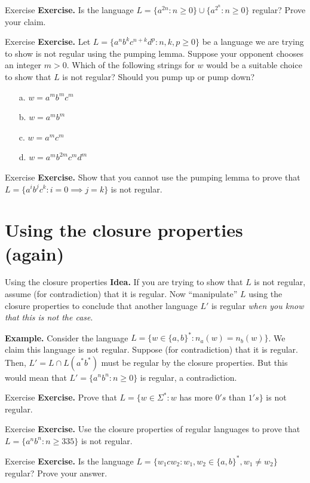 \documentclass[10pt]{beamer}
\begin{document}
\begin{frame}[t]{Exercise}
    \textbf{Exercise.} Is the language $L = \{a^{2n} : n \geq 0\} \cup \{a^{2^n} : n \geq 0 \}$ regular? Prove your claim.
\end{frame}

\begin{frame}[t]{Exercise}
    \textbf{Exercise.} Let $L = \{a^nb^kc^{n+k}d^p : n,k,p \geq 0\}$ be a language we are trying to show is not regular using the pumping lemma. Suppose your opponent chooses an integer $m > 0$. Which of the following strings for $w$ would be a suitable choice to show that $L$ is not regular? Should you pump up or pump down?
    \begin{itemize}
        \item[a.] $w = a^mb^mc^m$
        \item[b.] $w = a^mb^m$
        \item[c.] $w = a^mc^m$
        \item[d.] $w = a^mb^{2m}c^md^m$
    \end{itemize}
\end{frame}

\begin{frame}[t]{Exercise}
    \textbf{Exercise.} Show that you cannot use the pumping lemma to prove that $L = \{a^ib^jc^k : i = 0 \implies j = k\}$ is not regular.
\end{frame}

\section{Using the closure properties (again)}

\begin{frame}{Using the closure properties}
    \textbf{Idea.} If you are trying to show that $L$ is not regular, assume (for contradiction) that it is regular. Now ``manipulate'' $L$ using the closure properties to conclude that another language $L'$ is regular \textit{when you know that this is not the case}.

    \textbf{Example.} Consider the language $L = \{ w \in \{a, b\}^* : n_a(w) = n_b(w) \}$. We claim this language is not regular. Suppose (for contradiction) that it is regular. Then, $L' = L \cap L(a^*b^*)$ must be regular by the closure properties. But this would mean that $L' = \{a^nb^n : n \geq 0\}$ is regular, a contradiction.
\end{frame}

\begin{frame}[t]{Exercise}
    \textbf{Exercise.} Prove that $L=\{w\in \Sigma ^*: w$ has more $0's$ than $1's \}$ is not regular.
\end{frame}

\begin{frame}[t]{Exercise}
    \textbf{Exercise.} Use the closure properties of regular languages to prove that $L=\{{a^n}b^n: n\geq 335\}$ is not regular.
\end{frame}

\begin{frame}[t]{Exercise}
    \textbf{Exercise.} Is the language $L = \{w_1cw_2 : w_1,w_2 \in \{a,b\}^*, w_1 \neq w_2\}$ regular? Prove your answer.
\end{frame}
\end{document}
